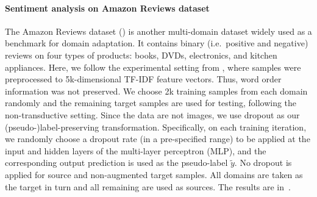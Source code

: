 \paragraph{Sentiment analysis on Amazon Reviews dataset} The Amazon Reviews dataset (\citet{Blitzer2007}) is another multi-domain dataset widely used as a benchmark for domain adaptation. It contains binary (i.e.\ positive and negative) reviews on four types of products: books, DVDs, electronics, and kitchen appliances. Here, we follow the experimental setting from \citet{Chen2012}, where samples were preprocessed to 5k-dimensional TF-IDF feature vectors. Thus, word order information was not preserved. We choose 2k training samples from each domain randomly and the remaining target samples are used for testing, following the non-transductive setting. Since the data are not images, we use dropout as our (pseudo-)label-preserving transformation. Specifically, on each training iteration, we randomly choose a dropout rate (in a pre-specified range) to be applied at the input and hidden layers of the multi-layer perceptron (MLP), and the corresponding output prediction is used as the pseudo-label $\tilde{y}$. No dropout is applied for source and non-augmented target samples. All domains are taken as the target in turn and all remaining are used as sources. The results are in~.

